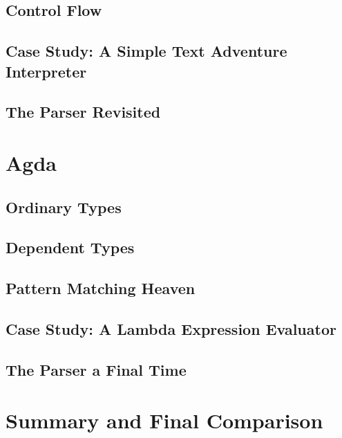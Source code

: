 \documentclass[11pt]{article}
\begin{document}
\subsection{Control Flow}

\subsection{Case Study: A Simple Text Adventure Interpreter}

\subsection{The Parser Revisited}

\section{Agda}

\subsection{Ordinary Types}

\subsection{Dependent Types}

\subsection{Pattern Matching Heaven}

\subsection{Case Study: A Lambda Expression Evaluator}

\subsection{The Parser a Final Time}

\section{Summary and Final Comparison}
\end{document}
